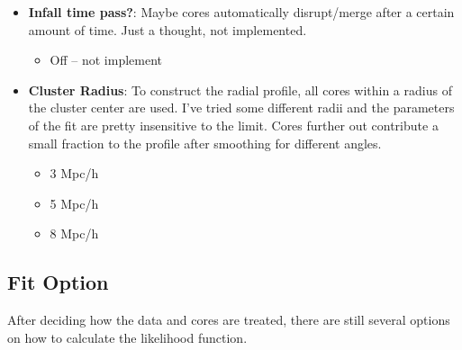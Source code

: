 \documentclass[twocolumn]{article}
\begin{document}
\begin{itemize}
\item \textbf{Infall time pass?}: Maybe cores automatically
  disrupt/merge after a certain amount of time. Just a thought, not
  implemented.
  \begin{itemize}
  \item Off -- not implement 
  \end{itemize}

\item \textbf{Cluster Radius}: To construct the radial profile, all
  cores within a radius of the cluster center are used. I've tried
  some different radii and the parameters of the fit are pretty
  insensitive to the limit. Cores further out contribute a small fraction
  to the profile after smoothing for different angles. 
  \begin{itemize}
    \item 3 Mpc/h
    \item 5 Mpc/h
    \item 8 Mpc/h
  \end{itemize}
  
\end{itemize}


\subsection{Fit Option}
After deciding how the data and cores are treated, there are still
several options on how to calculate the likelihood function.
\end{document}
